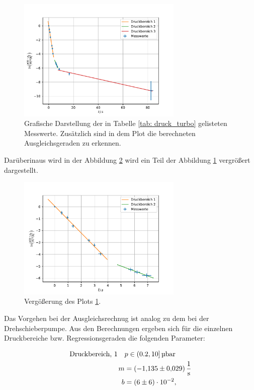 \FloatBarrier
\begin{figure}[h]
  \centering
  \includegraphics[width=0.7\textwidth]{../Messdaten/plots/turbo/druckplot_turbo.pdf}
  \caption{Grafische Darstellung der in Tabelle \ref{tab: druck_turbo} gelisteten Messwerte. Zusätzlich sind in dem Plot die berechneten Ausgleichsgeraden zu erkennen.}
  \label{fig: druck_turbo}
\end{figure}
\FloatBarrier
Darüberinaus wird in der Abbildung \ref{fig: druck_turbo_zoom} wird ein Teil der Abbildung \ref{fig: druck_turbo} vergrößert dargestellt.

\FloatBarrier
\begin{figure}[h]
  \centering
  \includegraphics[width=0.7\textwidth]{../Messdaten/plots/turbo/druckplot_turbo_zoom.pdf}
  \caption{Vergößerung des Plots \ref{fig: druck_turbo}.}
  \label{fig: druck_turbo_zoom}
\end{figure}
\FloatBarrier
Das Vorgehen bei der Ausgleichsrechnug ist analog zu dem bei der Drehschieberpumpe.
Aus den Berechnungen ergeben sich für die einzelnen Druckbereiche bzw. Regressionsgeraden die
folgenden Parameter:

\begin{align}
  \label{eq: regression_turbo_druck_1}
  \begin{aligned}
  \text{Druckbereich, 1} \quad  &p\in(0.2,10]\,\si{\micro\bar}  \\
  m&=\SI{-1.135\pm0.029 }{\per\second} \\
  b&=\num{ 6 \pm 6 e-2 },
\end{aligned}
\end{align}

